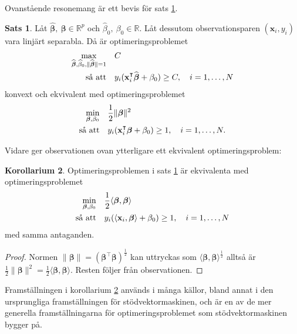 \documentclass[a4paper, 12pt]{report}
\theoremstyle{definition}
\newtheorem{thm}{Sats}[section]
\newtheorem{cor}[thm]{Korollarium}
\theoremstyle{remark}
\newcommand{\bfbeta}{{\boldsymbol{\beta}}}
\begin{document}
Ovanstående resonemang är ett bevis för sats \ref{thm:primallinearproblem}.
\begin{thm}\label{thm:primallinearproblem}
	Låt $\widehat{\bfbeta},~\bfbeta \in \mathbb{R}^p$ och $\widehat{\beta}_0,~\beta_0 \in \mathbb{R}$. Låt dessutom observationsparen $\left(\mathbf{x}_i, y_i\right)$ vara linjärt separabla. Då är optimeringsproblemet
	\begin{equation*}
	\begin{aligned}
	\operatornamewithlimits{max}_{\widehat{\bfbeta},\widehat{\beta}_0,\|\widehat{\bfbeta}\|=1} & & &C\\
	\text{så att} & & &y_i(\mathbf{x}_i^\intercal\widehat{\bfbeta}+\beta_0)\geq C,\quad i=1,\dots,N
	\end{aligned}
	\end{equation*}
	konvext och ekvivalent med optimeringsproblemet %
	\begin{equation*}
	\begin{aligned}
	\operatornamewithlimits{min}_{\bfbeta,\beta_0} & & &\frac{1}{2}\|\bfbeta\|^2\\
	\text{så att} & & &y_i(\mathbf{x}_i^\intercal\bfbeta+\beta_0)\geq 1,\quad i=1,\dots,N.
	\end{aligned}
	\end{equation*}
\end{thm}
Vidare ger observationen ovan ytterligare ett ekvivalent optimeringsproblem:
\begin{cor}\label{cor:inreproduktoptimering}
	Optimeringsproblemen i sats \ref{thm:primallinearproblem} är ekvivalenta med optimeringsproblemet
	\begin{equation*}
	\begin{aligned}
	\operatornamewithlimits{min}_{\bfbeta,\beta_0} & & &\frac{1}{2}\langle \bfbeta, \bfbeta \rangle\\
	\text{så att} & & &y_i(\langle \mathbf{x}_i,\bfbeta\rangle+\beta_0)\geq 1,\quad i=1,\dots,N
	\end{aligned}
	\end{equation*}
	med samma antaganden.
\end{cor}
\begin{proof}
	Normen $\|\bfbeta\|=(\bfbeta^\intercal\bfbeta)^{\frac{1}{2}}$ kan uttryckas som $\langle \bfbeta, \bfbeta \rangle^{\frac{1}{2}}$ alltså är $\frac{1}{2} \|\bfbeta\|^2=\frac{1}{2}\langle \bfbeta, \bfbeta \rangle$. Resten följer från observationen.
\end{proof}
Framställningen i korollarium \ref{cor:inreproduktoptimering} används i många källor, bland annat i den ursprungliga framställningen för stödvektormaskinen, %
och är en av de mer generella framställningarna för optimeringsproblemet som stödvektormaskinen bygger på. %
\end{document}
